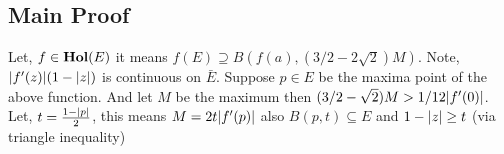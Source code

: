 \documentclass[../ComplexAnalysis_Notes.tex]{subfiles}
\begin{document}
\subsection*{Main Proof}
Let, $f \in \operatorname{\mathbf{Hol}}(E)$ it means $f(E)\supseteq B(f(a),(3/2-2\sqrt{2})M)$. Note, $\abs{f'(z)}(1-\abs{z})$ is continuous on $\bar{E}$. Suppose $p\in E$ be the maxima point of the above function. And let $M$ be the maximum then $(3/2-\sqrt{2})M > 1/12 \abs{f'(0)}$. Let, $t = \frac{1-\abs{p}}{2}$, this means $M = 2t \abs{f'(p)}$ also $B(p,t) \subseteq E$ and $1-\abs{z}\geq t$ (via triangle inequality)
\end{document}
